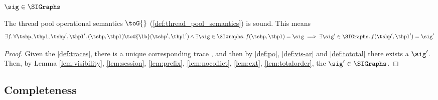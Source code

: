 \begin{defn}
    \(\sig \in \SIGraphs \)
\end{defn}

\begin{thm}
    The thread pool operational semantics $\toG{}$ (\ref{def:thread_pool_semantics}) is sound.
    This means
    \[
        \begin{array}{@{}l@{}}
            \exists f \ldotp \forall \tshp, \thpl, \tshp', \thpl' \ldotp (\tshp, \thpl) \toG{\lb} (\tshp', \thpl') \land \exists \sig \in \SIGraphs \ldotp f(\tshp, \thpl) = \sig \implies \exists \sig' \in \SIGraphs \ldotp f(\tshp', \thpl') = \sig'
        \end{array}
    \]
\end{thm}
\begin{proof}
    Given the  \ref{def:traces}, there is a unique corresponding trace \trace, and then by  \ref{def:po}, \ref{def:vis-ar} and \ref{def:tototal} there exists a \( \sig' \).
    Then, by Lemma \ref{lem:visibility}, \ref{lem:session}, \ref{lem:prefix}, \ref{lem:nocoflict}, \ref{lem:ext}, \ref{lem:totalorder}, the \( \sig' \in \SIGraphs \).
\end{proof}

\subsection{Completeness}

